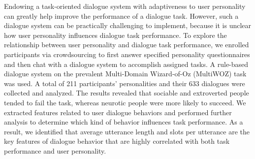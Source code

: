 Endowing a task-oriented dialogue system with adaptiveness to user personality can greatly help improve the performance of a dialogue task. However, such a dialogue system can be practically challenging to implement, because it is unclear how user personality influences dialogue task performance. To explore the relationship between user personality and dialogue task performance, we enrolled participants via crowdsourcing to first answer specified personality questionnaires and then chat with a dialogue system to accomplish assigned tasks. A rule-based dialogue system on the prevalent Multi-Domain Wizard-of-Oz (MultiWOZ) task was used. A total of 211 participants' personalities and their 633 dialogues were collected and analyzed. The results revealed that sociable and extroverted people tended to fail the task, whereas neurotic people were more likely to succeed. We extracted features related to user dialogue behaviors and performed further analysis to determine which kind of behavior influences task performance. As a result, we identified that average utterance length and slots per utterance are the key features of dialogue behavior that are highly correlated with both task performance and user personality.
